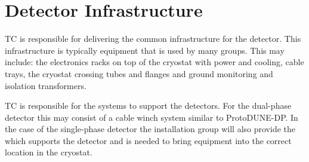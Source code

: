 \section{Detector Infrastructure}
\label{sec:fdsp-coord-infrastructure}

TC is responsible for delivering the common infrastructure for the
detector. This infrastructure is typically equipment that is used by
many groups. This may include: the electronics racks on top of the
cryostat with power and cooling, cable trays, the cryostat crossing
tubes and flanges and ground monitoring and isolation transformers.

TC is responsible for the systems to support the detectors. For the
dual-phase detector this may consist of a cable winch system similar
to ProtoDUNE-DP.  In the case of the single-phase detector the
installation group will also provide the  which supports
the detector and is needed to bring equipment into the correct
location in the cryostat.


